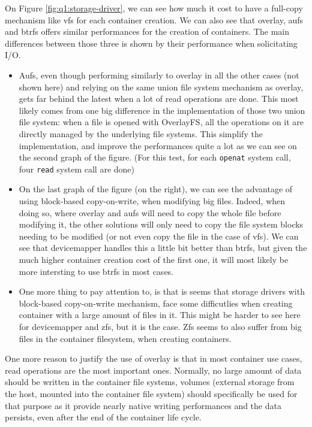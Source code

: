 On Figure \ref{fig:q1:storage-driver}, we can see how much it cost to have a full-copy mechanism like vfs for each container creation.  We can also see that overlay, aufs and btrfs offers similar performances for the creation of containers.  The main differences between those three is shown by their performance when solicitating I/O.  
\begin{itemize}
  \item Aufs, even though performing similarly to overlay in all the other cases (not shown here) and relying on the same union file system mechanism as overlay, gets far behind the latest when a lot of read operations are done.  This most likely comes from one big difference in the implementation of those two union file system: when a file is opened with OverlayFS, all the operations on it are directly managed by the underlying file systems.  This simplify the implementation, and improve the performances quite a lot as we can see on the second graph of the figure.  (For this test, for each \texttt{openat} system call, four \texttt{read} system call are done)
  \item On the last graph of the figure (on the right), we can see the advantage of using block-based copy-on-write, when modifying big files.  Indeed, when doing so, where overlay and aufs will need to copy the whole file before modifying it, the other solutions will only need to copy the file system blocks needing to be modified (or not even copy the file in the case of vfs).  We can see that devicemapper handles this a little bit better than btrfs, but given the much higher container creation cost of the first one, it will most likely be more intersting to use btrfs in most cases.
  \item One more thing to pay attention to, is that is seems that storage drivers with block-based copy-on-write mechanism, face some difficutlies when creating container with a large amount of files in it.  This might be harder to see here for devicemapper and zfs, but it is the case.  Zfs seems to also suffer from big files in the container filesystem, when creating containers.
\end{itemize}
One more reason to justify the use of overlay is that in most container use cases, read operations are the most important ones.  Normally, no large amount of data should be written in the container file systems, volumes (external storage from the host, mounted into the container file system) should specifically be used for that purpose as it provide nearly native writing performances and the data persists, even after the end of the container life cycle.

